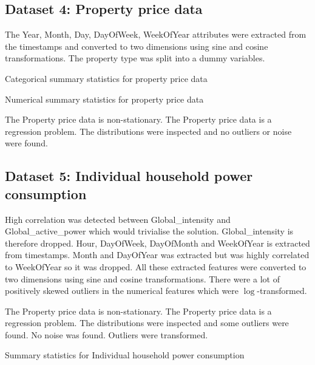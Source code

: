 \documentclass[conference]{IEEEtran}
\begin{document}
\subsection{Dataset 4: Property price data}

The Year, Month, Day, DayOfWeek, WeekOfYear attributes were extracted from the timestamps and converted to two dimensions using sine and cosine transformations. The property type was split into a dummy variables.

\begin{table}[H]
	\centering
	\caption{Categorical summary statistics for property price data}
	\small
	
	\label{tab:house-stats-1}
\end{table}

\begin{table}[H]
	\centering
	\caption{Numerical summary statistics for property price data}
	\small
	
	\label{tab:house-stats-2}
\end{table}

The Property price data is non-stationary. The Property price data is a regression problem. The distributions were inspected and no outliers or noise were found.


\subsection{Dataset 5: Individual household power consumption}

High correlation was detected between Global\_intensity and Global\_active\_power which would trivialise the solution. Global\_intensity is therefore dropped. Hour, DayOfWeek, DayOfMonth and WeekOfYear is extracted from timestamps. Month and DayOfYear was extracted but was highly correlated to WeekOfYear so it was dropped. All these extracted features were converted to two dimensions using sine and cosine transformations. There were a lot of positively skewed outliers in the numerical features which were $\log$-transformed.

The Property price data is non-stationary. The Property price data is a regression problem. The distributions were inspected and some outliers were found. No noise was found. Outliers were transformed.	

\begin{table}[H]
	\centering
	\caption{Summary statistics for Individual household power consumption}
	\label{tab:power-stats}
\end{table}
\end{document}
